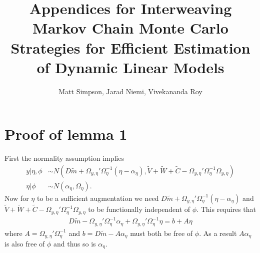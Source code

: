 \documentclass{article}
\begin{document}
\title{Appendices for Interweaving Markov Chain Monte Carlo Strategies for Efficient
Estimation of Dynamic Linear Models}
\author{Matt Simpson, Jarad Niemi, Vivekananda Roy}
\maketitle
\appendix
\renewcommand\thefigure{\thesection.\arabic{figure}}    
\section{Proof of lemma 1}

First the normality assumption implies
\begin{align*}
  y|\eta,\phi &\sim N(D\tilde{m} + \Omega_{y,\eta}'\Omega_\eta^{-1}(\eta - \alpha_\eta), \tilde{V} + \tilde{W} + \tilde{C}- \Omega_{y,\eta}'\Omega_{\eta}^{-1}\Omega_{y,\eta})\\
  \eta|\phi &\sim N(\alpha_\eta, \Omega_\eta).
\end{align*}
Now for $\eta$ to be a sufficient augmentation we need $D\tilde{m} + \Omega_{y,\eta}'\Omega_\eta^{-1}(\eta - \alpha_\eta)$ and $\tilde{V} + \tilde{W} + \tilde{C} - \Omega_{y,\eta}'\Omega_{\eta}^{-1}\Omega_{y,\eta}$ to be functionally independent of $\phi$. This requires that
\begin{align*}
  D\tilde{m} - \Omega_{y,\eta}'\Omega_\eta^{-1}\alpha_\eta + \Omega_{y,\eta}'\Omega_\eta^{-1}\eta  = b + A\eta
\end{align*}
where $A=\Omega_{y,\eta}'\Omega_\eta^{-1}$ and $b=D\tilde{m} - A\alpha_\eta$ must both be free of $\phi$. As a result $A\alpha_\eta$ is also free of $\phi$ and thus so is $\alpha_{\eta}$.
\end{document}
